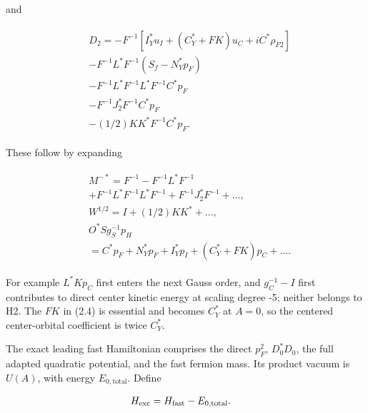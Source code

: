 and

\begin{gather*}
\begin{aligned}
& D_{2} = -F^{-1}[I_{Y}^{*} u_{I}+(C_{Y}^{*}+F K)u_{C}+i C^{*} \rho _{F2}] \\
& -F^{-1} L^{*} F^{-1}(S_{f}-N_{Y}^{*} p_{F}) \\
& -F^{-1} L^{*} F^{-1} L^{*} F^{-1} C^{*} p_{F} \\
& -F^{-1} J_{2}^{*} F^{-1} C^{*} p_{F} \\
& -(1/2)KK^{*} F^{-1} C^{*} p_{F}.
\end{aligned}\tag{2.4}
\end{gather*}

These follow by expanding

\begin{gather*}
\begin{aligned}
& M^{-*}=F^{-1}-F^{-1}L^{*}F^{-1} \\
& +F^{-1}L^{*}F^{-1}L^{*}F^{-1}+F^{-1}J_{2}^{*}F^{-1}+\ldots , \\
& W^{1/2}=I+(1/2)KK^{*}+\ldots , \\
& O^{*}Sg_{S}^{-1}p_{H} \\
& =C^{*}p_{F}+N_{Y}^{*}p_{F}+I_{Y}^{*}p_{I}+(C_{Y}^{*}+F K)p_{C}+\ldots  .
\end{aligned}\tag{2.5}
\end{gather*}

For example \(L^{*}K p_{C}\) first enters the next Gauss order, and
\(g_{C}^{-1}-I\) first contributes to direct center kinetic energy at
scaling degree -5; neither belongs to H2. The \(F K\) in (2.4) is
essential and becomes \(C_{Y}^{*}\) at \(A=0\), so the centered
center-orbital coefficient is twice \(C_{Y}^{*}\).

The exact leading fast Hamiltonian comprises the direct \(p_{F}^{2}\),
\(D_{0}^{*}D_{0}\), the full adapted quadratic potential, and the fast
fermion mass. Its product vacuum is \(U(A)\), with energy
\(E_{0,\mathrm{total}}\). Define

\begin{gather*}
\begin{aligned}
& H_{\mathrm{exc}} = H_{\mathrm{fast}}-E_{0,\mathrm{total}}.
\end{aligned}\notag
\end{gather*}

